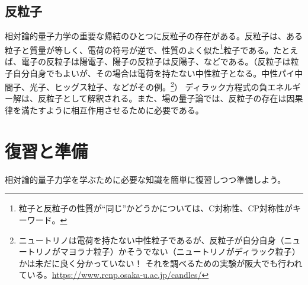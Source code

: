 \documentclass[10pt,a4paper]{jarticle}
\begin{document}
\subsection{反粒子}
相対論的量子力学の重要な帰結のひとつに反粒子の存在がある。反粒子は、ある粒子と質量が等しく、電荷の符号が逆で、性質のよく似た\footnote{粒子と反粒子の性質が``同じ''かどうかについては、C対称性、CP対称性がキーワード。}粒子である。たとえば、電子の反粒子は陽電子、陽子の反粒子は反陽子、などである。（反粒子は粒子自分自身でもよいが、その場合は電荷を持たない中性粒子となる。中性パイ中間子、光子、ヒッグス粒子、などがその例。\footnote{
ニュートリノは電荷を持たない中性粒子であるが、反粒子が自分自身（ニュートリノがマヨラナ粒子）かそうでない（ニュートリノがディラック粒子）かは未だに良く分かっていない！
それを調べるための実験が阪大でも行われている。\url{https://www.rcnp.osaka-u.ac.jp/candles/}}）
ディラック方程式の負エネルギー解は、反粒子として解釈される。また、場の量子論では、反粒子の存在は因果律を満たすように相互作用させるために必要である。

\section{復習と準備}
相対論的量子力学を学ぶために必要な知識を簡単に復習しつつ準備しよう。
\end{document}
